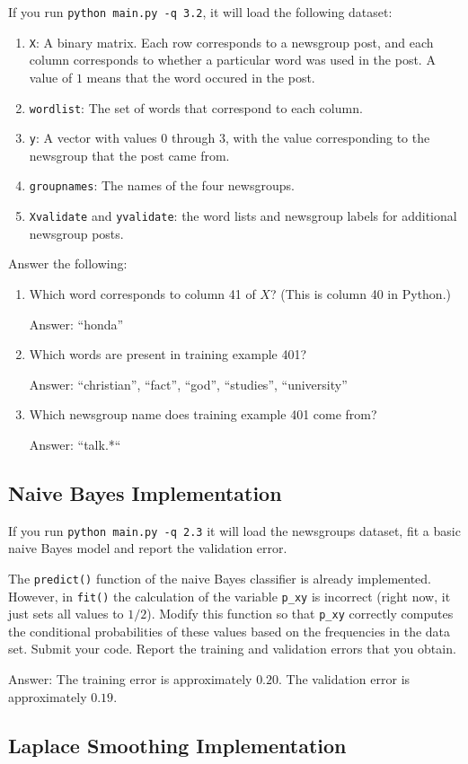 \documentclass{article}
\def\ans#1{\par\gre{Answer: #1}}
\def\blu#1{{\color{blu}#1}}
\def\gre#1{{\color{gre}#1}}
\def\enum#1{\begin{enumerate}#1\end{enumerate}}
\begin{document}
	If you run \texttt{python main.py -q 3.2}, it will load the following dataset:
	\enum{
		\item \texttt{X}: A binary matrix. Each row corresponds to a newsgroup post, and each column corresponds to whether a particular word was used in the post. A value of $1$ means that the word occured in the post.
		\item \texttt{wordlist}: The set of words that correspond to each column.
		\item \texttt{y}: A vector with values $0$ through $3$, with the value corresponding to the newsgroup that the post came from.
		\item \texttt{groupnames}: The names of the four newsgroups.
		\item \texttt{Xvalidate} and \texttt{yvalidate}: the word lists and newsgroup labels for additional newsgroup posts.
	}
	\blu{Answer the following}:
	\enum{
		\item Which word corresponds to column 41 of $X$? (This is column 40 in Python.)
		\ans{``honda''}
		\item Which words are present in training example 401?
		\ans{``christian'', ``fact'', ``god'', ``studies'', ``university''}
		\item Which newsgroup name does training example 401 come from?
		\ans{``talk.*``}
	}
	
	\subsection{Naive Bayes Implementation}
	
	If you run \texttt{python main.py -q 2.3}
	it will load the newsgroups dataset, fit a basic naive Bayes model and report the validation error.
	
	The \texttt{predict()} function of the naive Bayes classifier is already implemented.
	However, in \texttt{fit()}
	the calculation of the variable \texttt{p\_xy} is incorrect
	(right now, it just sets all values to $1/2$).
	\blu{Modify this function so that \texttt{p\_xy} correctly
		computes the conditional probabilities of these values based on the
		frequencies in the data set. Submit your code. Report the training and validation errors that you obtain.}
	\ans{
		The training error is approximately $0.20$.
		The validation error is approximately $0.19$.
	}
	
	\subsection{Laplace Smoothing Implementation}
	
\end{document}
